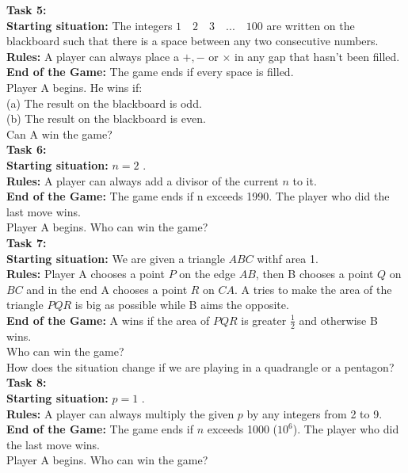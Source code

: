 \documentclass[11pt,a5paper]{article}
\begin{document}
\noindent
\textbf{Task 5:}\\
\noindent
\textbf{Starting situation:} The integers $1 \quad 2 \quad 3 \quad... \quad 100$ are written on the blackboard such that there is a space between any two consecutive numbers.\\
\textbf{Rules:} A player can always place a $+, -$ or $\times$ in any gap that hasn't been filled.\\
\textbf{End of the Game:} The game ends if every space is filled.\\
\noindent
Player A begins. He wins if:\\
(a) The result on the blackboard is odd.\\
(b) The result on the blackboard is even.\\
Can A win the game?\\


\noindent
\textbf{Task 6:}\\
\noindent
\textbf{Starting situation:} $n=2$ .\\
\textbf{Rules:} A player can always add a divisor of the current $n$ to it.\\
\textbf{End of the Game:} The game ends if n exceeds 1990. The player who did the last move wins.\\
\noindent
Player A begins. Who can win the game?\\

\noindent
\textbf{Task 7:}\\
\noindent
\textbf{Starting situation:} We are given a triangle $ABC$ withf area 1. \\
\textbf{Rules:} Player A chooses a point $P$ on the edge $AB$, then B chooses a point $Q$ on $BC$ and in the end A chooses a point $R$ on $CA$. A tries to make the area of the triangle $PQR$ is big as possible while B aims the opposite.\\
\textbf{End of the Game:} A wins if the area of $PQR$ is greater $\frac{1}{2}$ and otherwise B wins.\\
\noindent
 Who can win the game?\\
How does the situation change if we are playing in a quadrangle or a pentagon?\\

\noindent
\textbf{Task 8:}\\
\noindent
\textbf{Starting situation:} $p=1$ .\\
\textbf{Rules:} A player can always multiply the given $p$ by any integers from 2 to 9.\\
\textbf{End of the Game:} The game ends if $n$ exceeds 1000 ($10^6$). The player who did the last move wins.\\
\noindent
Player A begins. Who can win the game?\\
\end{document}
